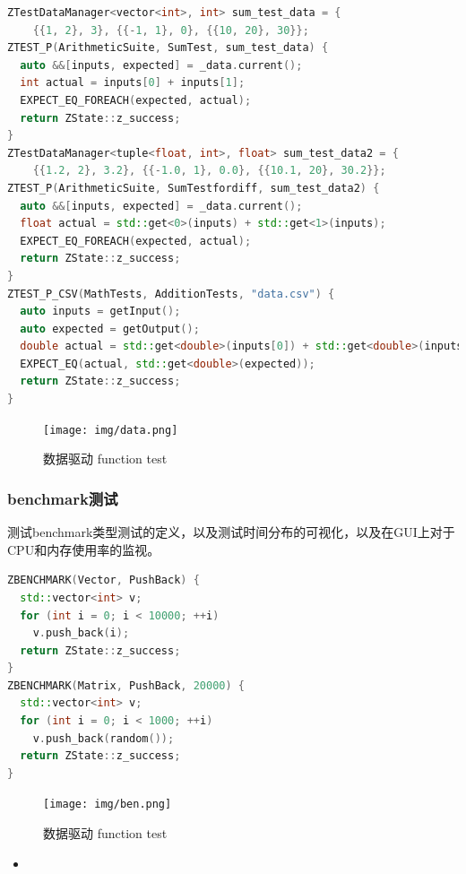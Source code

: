 \documentclass{article}
\begin{document}
\begin{framed}
    \begin{lstlisting}[language=C++]
ZTestDataManager<vector<int>, int> sum_test_data = {
    {{1, 2}, 3}, {{-1, 1}, 0}, {{10, 20}, 30}};
ZTEST_P(ArithmeticSuite, SumTest, sum_test_data) {
  auto &&[inputs, expected] = _data.current();
  int actual = inputs[0] + inputs[1];
  EXPECT_EQ_FOREACH(expected, actual);
  return ZState::z_success;
}
ZTestDataManager<tuple<float, int>, float> sum_test_data2 = {
    {{1.2, 2}, 3.2}, {{-1.0, 1}, 0.0}, {{10.1, 20}, 30.2}};
ZTEST_P(ArithmeticSuite, SumTestfordiff, sum_test_data2) {
  auto &&[inputs, expected] = _data.current();
  float actual = std::get<0>(inputs) + std::get<1>(inputs);
  EXPECT_EQ_FOREACH(expected, actual);
  return ZState::z_success;
}
ZTEST_P_CSV(MathTests, AdditionTests, "data.csv") {
  auto inputs = getInput();
  auto expected = getOutput();
  double actual = std::get<double>(inputs[0]) + std::get<double>(inputs[1]);
  EXPECT_EQ(actual, std::get<double>(expected));
  return ZState::z_success;
}
\end{lstlisting}
\end{framed}
\begin{figure}[H]
    \centering
    \texttt{[image: img/data.png]}
    \caption{数据驱动 function test}
    \label{fig: 数据驱动 function test}
\end{figure}
\subsubsection{benchmark测试}
测试benchmark类型测试的定义，以及测试时间分布的可视化，以及在GUI上对于CPU和内存使用率的监视。

\begin{framed}

    \begin{lstlisting}[language=C++]
ZBENCHMARK(Vector, PushBack) {
  std::vector<int> v;
  for (int i = 0; i < 10000; ++i)
    v.push_back(i);
  return ZState::z_success;
}
ZBENCHMARK(Matrix, PushBack, 20000) {
  std::vector<int> v;
  for (int i = 0; i < 1000; ++i)
    v.push_back(random());
  return ZState::z_success;
}\end{lstlisting}
\end{framed}
\begin{figure}[H]
    \centering
    \texttt{[image: img/ben.png]}
    \caption{数据驱动 function test}
    \label{fig: 数据驱动 function test}
\end{figure}

\begin{itemize}
    \item
\end{itemize}
\end{document}
